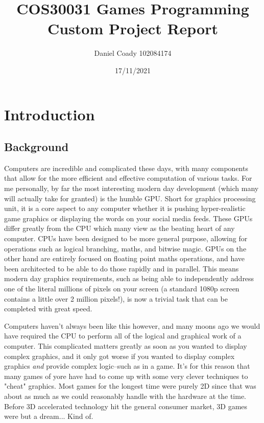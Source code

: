 \documentclass{article}
\title{COS30031 Games Programming\\Custom Project Report}
\author{Daniel Coady 102084174}
\date{17/11/2021}
\begin{document}
\maketitle

\pagebreak

\tableofcontents

\pagebreak

\section{Introduction}
\subsection{Background}
Computers are incredible and complicated these days, with many components that
allow for the more efficient and effective computation of various tasks. For me
personally, by far the most interesting modern day development (which many will
actually take for granted) is the humble GPU. Short for graphics processing
unit, it is a core aspect to any computer whether it is pushing hyper-realistic
game graphics or displaying the words on your social media feeds. These GPUs
differ greatly from the CPU which many view as the beating heart of any
computer. CPUs have been designed to be more general purpose, allowing for
operations such as logical branching, maths, and bitwise magic. GPUs on the
other hand are entirely focused on floating point maths operations, and have
been architected to be able to do those rapidly and in parallel. This means
modern day graphics requirements, such as being able to independently address
one of the literal millions of pixels on your screen (a standard 1080p screen
contains a little over 2 million pixels!), is now a trivial task that can be
completed with great speed.

Computers haven't always been like this however, and many moons ago we would
have required the CPU to perform all of the logical and graphical work of a
computer. This complicated matters greatly as soon as you wanted to display
complex graphics, and it only got worse if you wanted to display complex
graphics \textit{and} provide complex logic--such as in a game. It's for this
reason that many games of yore have had to come up with some very clever
techniques to "cheat" graphics. Most games for the longest time were purely 2D
since that was about as much as we could reasonably handle with the hardware
at the time. Before 3D accelerated technology hit the general consumer market,
3D games were but a dream... Kind of.
\end{document}
